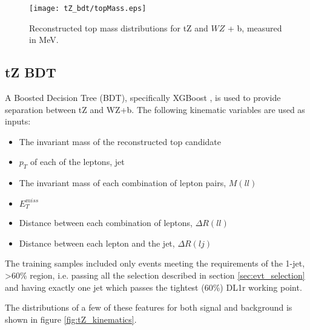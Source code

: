 \begin{figure}
    \centering
    \texttt{[image: tZ\_bdt/topMass.eps]}
    \caption{Reconstructed top mass distributions for tZ and $WZ$ + b, measured in MeV.}
    \label{fig:topMass}
\end{figure}

\subsection{tZ BDT}
\label{subsec:tZ_bdt}
 
A Boosted Decision Tree (BDT), specifically XGBoost \cite{xgboost_cite}, is used to provide separation between tZ and WZ+b. The following kinematic variables are used as inputs:
 
 \begin{itemize}
     \item The invariant mass of the reconstructed top candidate
     \item $p_T$ of each of the leptons, jet
     \item The  invariant mass of each combination of lepton pairs, $M(ll)$
     \item $E_T^{miss}$
     \item Distance between each combination of leptons, $\Delta R (ll)$
     \item Distance between each lepton and the jet, $\Delta R (lj)$
 \end{itemize}
 
The training samples included only events meeting the requirements of the 1-jet, >60\% region, i.e. passing all the selection described in section \ref{sec:evt_selection} and having exactly one jet which passes the tightest (60\%) DL1r working point.
 
The distributions of a few of these features for both signal and background is shown in figure \ref{fig:tZ_kinematics}.
 
